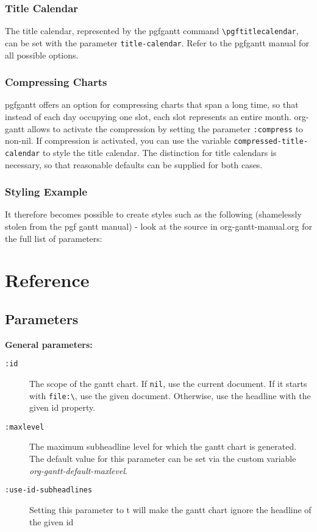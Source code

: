 \documentclass[11pt]{article}
\begin{document}
\subsubsection{Title Calendar}
\label{sec:org56cf5ef}
The title calendar, represented by the pgfgantt command \texttt{\textbackslash{}pgftitlecalendar}, can be set with the parameter \texttt{title-calendar}. Refer to the pgfgantt manual for all possible options.

\subsubsection{Compressing Charts}
\label{sec:orgbfdab39}
pgfgantt offers an option for compressing charts that span a long time, so that instead of each day occupying one slot, each slot represents an entire month. org-gantt allows to activate the compression by setting the parameter \texttt{:compress} to non-nil. If compression is activated, you can use the variable \texttt{compressed-title-calendar} to style the title calendar. The distinction for title calendars is necessary, so that reasonable defaults can be supplied for both cases.

\subsubsection{Styling Example}
\label{sec:orgdb5c61e}
It therefore becomes possible to create styles such as the following (shamelessly stolen from the pgf gantt manual) - look at the source in org-gantt-manual.org for the full list of parameters:
\section{Reference}
\label{sec:org60e3be4}
\subsection{Parameters}
\label{sec:org5d382fa}
\noindent
\textbf{General parameters:}
\begin{description}
\item[{\texttt{:id}}] The scope of the gantt chart. If \texttt{nil}, use the current document. If it starts with \texttt{file:\textbackslash{}}, use the given document. Otherwise, use the headline with the given id property.
\item[{\texttt{:maxlevel}}] The maximum subheadline level for which the gantt chart is generated. The default value for this parameter can be set via the custom variable \emph{org-gantt-default-maxlevel}.
\item[{\texttt{:use-id-subheadlines}}] Setting this parameter to t will make the gantt chart ignore the headline of the given id
\end{description}
\end{document}

